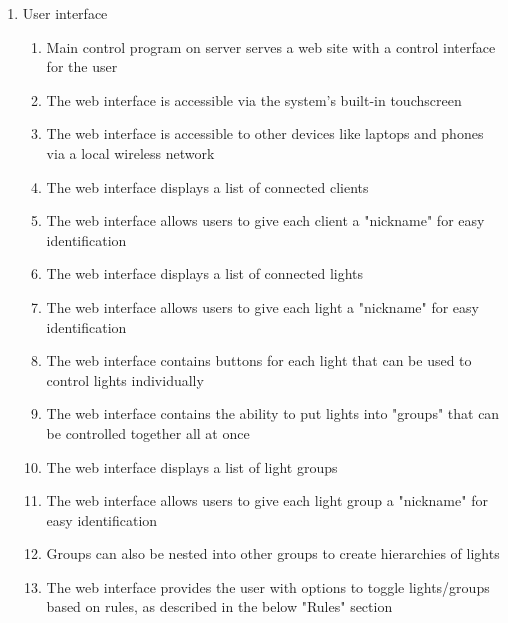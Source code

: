 \documentclass[12pt]{article}
\begin{document}
\begin{enumerate}
    \item User interface
        \begin{enumerate}
            \item Main control program on server serves a web site with a control interface for the user
            \item The web interface is accessible via the system's built-in touchscreen
            \item The web interface is accessible to other devices like laptops and phones via a local wireless network
            \item The web interface displays a list of connected clients
            \item The web interface allows users to give each client a "nickname" for easy identification
            \item The web interface displays a list of connected lights
            \item The web interface allows users to give each light a "nickname" for easy identification
            \item The web interface contains buttons for each light that can be used to control lights individually
            \item The web interface contains the ability to put lights into "groups" that can be controlled together all at once
            \item The web interface displays a list of light groups
            \item The web interface allows users to give each light group a "nickname" for easy identification
            \item Groups can also be nested into other groups to create hierarchies of lights
            \item The web interface provides the user with options to toggle lights/groups based on rules, as described in the below "Rules" section
        \end{enumerate}


\end{enumerate}
\end{document}
